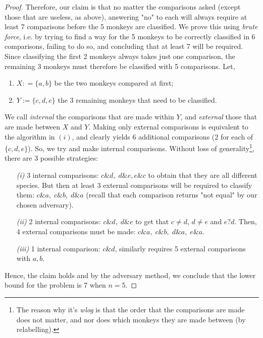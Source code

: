 \documentclass[12pt]{article}
\theoremstyle{definition}
\theoremstyle{remark}
\begin{document}
\begin{enumerate}
\begin{proof}
    \hspace{24pt}Therefore, our claim is that no matter the comparisons asked (except those that are useless, as above), answering "no" to each will always require at least 7 comparisons before the 5 monkeys are classified. We prove this using \textit{brute force}, i.e. by trying to find a way for the 5 monkeys to be correctly classified in 6 comparisons, failing to do so, and concluding that at least 7 will be required. Since classifying the first 2 monkeys always takes just one comparison, the remaining 3 monkeys must therefore be classified with 5 comparisons. Let,
    \begin{enumerate}
      \item $X : =\{a, b\}$ be the two monkeys compared at first;  
      \item $Y:= \{c,d,e\}$ the 3 remaining monkeys that need to be classified. 
    \end{enumerate}

    We call \textit{internal} the comparisons that are made within $Y$, and \textit{external} those that are made between $X$ and $Y$. Making only external comparisons is equivalent to the algorithm in $(i)$, and clearly yields 6 additional comparisons (2 for each of $\{c,d,e\}$). So, we try and make internal comparisons. Without loss of generality\footnote{The reason why it's \textit{wlog} is that the order that the comparisons are made does not matter, and nor does which monkeys they are made between (by relabelling).}, there are 3 possible strategies: 
    \begin{enumerate}
      \item[\it (i)] 3 internal comparisons: $c\&d, \; d\&e, e\&c$ to obtain that they are all different species. But then at least 3 external comparisons will be required to classify them: $c\&a,\; c\&b,\; d\&a$ (recall that each comparison returns "not equal" by our chosen adversary). 
      \item[\it (ii)] 2 internal comparisons: $c\&d, \; d\&e$ to get that $c\neq d$, $d \neq e$ and $e?d.$ Then, 4 external comparisons must be made: $c\&a,\; c\&b, \;d\&a,\; e\&a.$
      \item[\it (iii)] 1 internal comparison: $c\&d$, similarly requires 5 external comparisons with $a, b.$
    \end{enumerate}
    Hence, the claim holds and by the adversary method, we conclude that the lower bound for the problem is 7 when $n=5.$
  \end{proof}



\end{enumerate}
\end{document}
